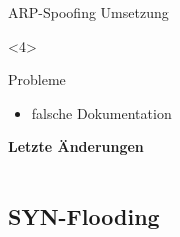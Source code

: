 \begin{frame}[fragile, t]{ARP-Spoofing Umsetzung}
	\begin{onlyenv}
		\begin{block}{Probleme}
			\begin{itemize}
				\item falsche Dokumentation
			\end{itemize}
		\end{block}
	
		\textbf{Letzte Änderungen} \\
		\begin{tabular}{c}
			
		\end{tabular}
	\end{onlyenv}
\end{frame}


\subsection{SYN-Flooding}

